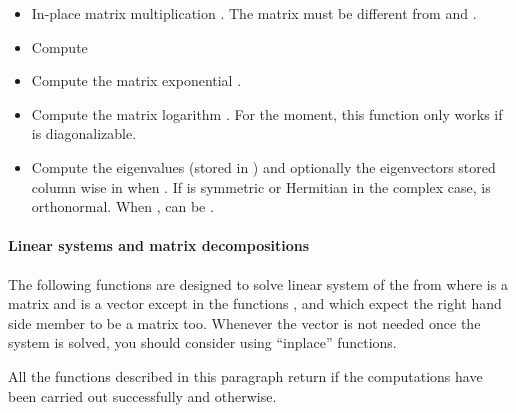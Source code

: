 \begin{itemize}
\item {} 
    \sshortdescribe In-place matrix multiplication  . The
    matrix  must be different from  and .

\item {}
  \sshortdescribe Compute 
\item {}
  \sshortdescribe Compute the matrix exponential .

\item {}
  \sshortdescribe Compute the matrix logarithm . For the
  moment, this function only works if  is diagonalizable.

\item {}
  \sshortdescribe Compute the eigenvalues (stored in ) and optionally
  the eigenvectors stored column wise in  when
  . If  is symmetric or Hermitian in the
  complex case,  is orthonormal. When ,
   can be .
\end{itemize}


\paragraph{Linear systems and matrix decompositions}

The following functions are designed to solve linear system of the from  where  is a matrix and  is a vector except in the functions
,  and
 which expect the right hand side member to be a
matrix too. Whenever the vector  is not needed once the system is solved,
you should consider using ``inplace'' functions.


All the functions described in this paragraph return  if the
computations have been carried out successfully and  otherwise.


